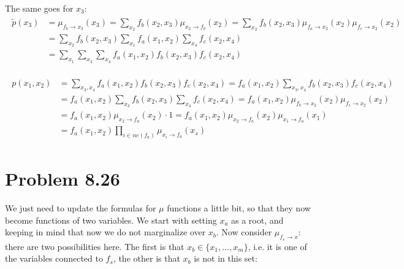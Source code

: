 \documentclass[fleqn]{article}
\begin{document}
The same goes for $x_3$:
\begin{align}
	\begin{split}
		\tilde p(x_3) &= \mu_{f_b\to x_3}(x_3) = \sum\limits_{x_2}f_b(x_2, x_3)\mu_{x_2\to f_b}(x_2) =  \sum\limits_{x_2}f_b(x_2, x_3)\mu_{f_a\to x_2}(x_2) \mu_{f_c\to x_2}(x_2) \\
		&= \sum\limits_{x_2}f_b(x_2, x_3)\sum\limits_{x_1}f_a(x_1, x_2)\sum\limits_{x_4}f_c(x_2, x_4) \\
		&= \sum\limits_{x_1}\sum\limits_{x_2}\sum\limits_{x_4}f_a(x_1, x_2)f_b(x_2, x_3)f_c(x_2, x_4)
	\end{split}
\end{align}


\begin{align}
\begin{split}
	p(x_1, x_2) &= \sum\limits_{x_3,x_4}f_a(x_1,x_2)f_b(x_2,x_3)f_c(x_2, x_4) = f_a(x_1,x_2)\sum\limits_{x_3,x_4}f_b(x_2,x_3)f_c(x_2, x_4) \\
	&= f_a(x_1,x_2)\sum\limits_{x_3}f_b(x_2,x_3)\sum\limits_{x_4}f_c(x_2, x_4) = f_a(x_1,x_2)\mu_{f_b\to x_2}(x_2)\mu_{f_c\to x_2}(x_2) \\
	&= f_a(x_1,x_2)\mu_{x_2 \to f_a}(x_2) \cdot 1 = f_a(x_1,x_2)\mu_{x_2 \to f_a}(x_2) \mu_{x_1 \to f_a}(x_1) \\
	&= f_a(x_1, x_2) \prod\limits_{i \in ne(f_a)} \mu_{x_i \to f_a}(x_s)
\end{split}
\end{align}

\section*{Problem 8.26}

We just need to update the formulas for $\mu$ functions a little bit, so that they now become functions of two variables. We start with setting $x_a$ as a root, and keeping in mind that now we do not marginalize over $x_b$. Now consider $\mu_{f_s\to x}$: there are two possibilities here. The first is that $x_b \in \{x_1,...,x_m\}$, i.e. it is one of the variables connected to $f_s$, the other is that $x_b$ is not in this set:
\end{document}
